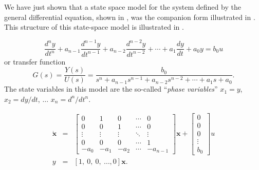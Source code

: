 We have just shown that a state space model
for the system defined by the general differential equation, shown
in , was the companion form illustrated in
. This structure of this state-space model is
illustrated in .
\begin{slide}\label{slide:l5s1}
\[ \frac{d^{n}y}{dt^{n}} +
a_{n-1}\frac{d^{n-1}y}{dt^{n-1}}+a_{n-2}\frac{d^{n-2}y}{dt^{n-2}}+\cdots+a_1\frac{dy}{dt}+a_0
y = b_0 u
\]
or transfer function
\[
G(s) = \frac{Y(s)}{U(s)} = \frac{b_0}{s^n +
a_{n-1}s^{n-1}+a_{n-2}s^{n-2}+\cdots+a_1s+a_0}.
\]
The state variables in this model are the so-called ``\emph{phase
variables}'' $x_1 = y$, $x_2 = dy/dt$, $\ldots$ $x_n = d^n/dt^n$.
\end{slide}
\begin{slide}\label{slide:l5s2}
\begin{eqnarray*} \dot{\mathbf{x}} &=&
\left[\begin{array}{ccccc}
  0 & 1 & 0 & \cdots & 0 \\
  0 & 0 & 1 & \cdots & 0 \\
  \vdots & \vdots & \vdots & \ddots & \vdots \\
  0 & 0 & 0 & \cdots & 1 \\
  -a_{0} & -a_{1} & -a_{2} & \cdots & -a_{n-1}
\end{array}\right]\mathbf{x}+\left[\begin{array}{c}
  0 \\
  0 \\
  0 \\
  \vdots \\
  b_0
\end{array}\right]u\\
y & = & [1,\ 0,\ 0,\ \ldots, 0] \mathbf{x}.
\end{eqnarray*}
\end{slide}
\begin{slide}\label{slide:l5s3}
\end{slide}

